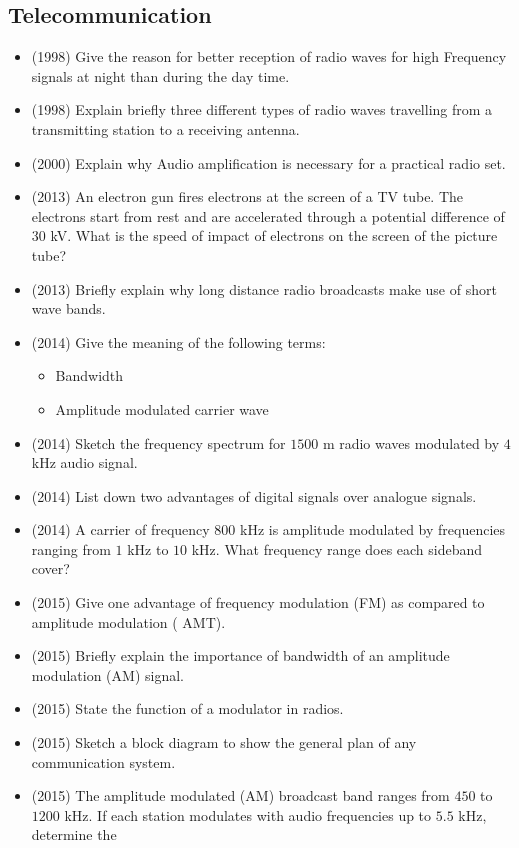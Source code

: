 \documentclass{article}
\begin{document}
\subsection{Telecommunication}
\begin{itemize}
\item (1998)  Give the reason for better reception of radio waves for high Frequency signals at night than during the day time.
\item (1998)  Explain briefly three different types of radio waves travelling from a transmitting station to a receiving antenna.
\item (2000)  Explain why Audio amplification is necessary for a practical radio set.
\item (2013)  An electron gun fires electrons at the screen of a TV tube. The electrons start from rest and are accelerated through a potential difference of $ 30$ kV. What is the speed of impact of electrons on the screen of the picture tube?
\item (2013)  Briefly explain why long distance radio broadcasts make use of short wave bands.
\item (2014)  Give the meaning of the following terms:
 \begin{itemize}
\item Bandwidth
\item  Amplitude modulated carrier wave
\end{itemize}
\item (2014)  Sketch the frequency spectrum for $ 1500$ m radio waves modulated by $ 4$ kHz audio signal.
\item (2014)  List down two advantages of digital signals over analogue signals.
\item (2014)  A carrier of frequency $ 800$ kHz is amplitude modulated by frequencies ranging from $ 1$ kHz to $ 10$ kHz.  What frequency range does each sideband cover?
\item (2015)  Give one advantage of frequency modulation (FM) as compared to amplitude modulation ( AMT).
\item (2015)  Briefly explain the importance of bandwidth of an amplitude modulation (AM) signal.
\item (2015)  State the function of a modulator in radios.
\item (2015)  Sketch a block diagram to show the general plan of any communication system.
\item (2015)  The amplitude modulated (AM) broadcast band ranges from $ 450$ to $ 1200$ kHz. If each station modulates with audio frequencies up to $ 5.5$ kHz, determine the

\end{itemize}
\end{document}
